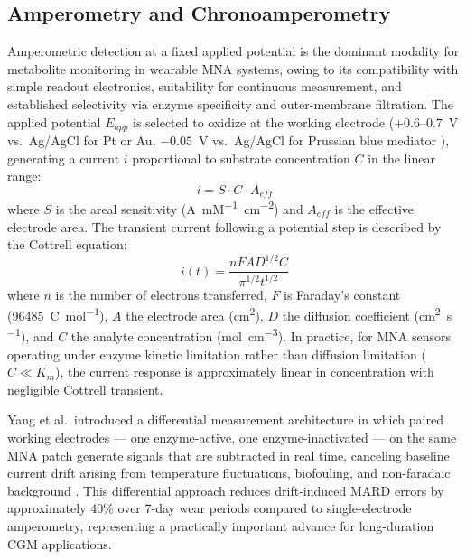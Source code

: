 \documentclass[review,1p]{elsarticle}
\begin{document}
\subsection{Amperometry and Chronoamperometry}
\label{subsec:amperometry}

Amperometric detection at a fixed applied potential is the dominant modality for metabolite monitoring in wearable MNA systems, owing to its compatibility with simple readout electronics, suitability for continuous measurement, and established selectivity via enzyme specificity and outer-membrane filtration. The applied potential $E_{app}$ is selected to oxidize  at the working electrode ($+0.6$--$0.7$~V vs.~Ag/AgCl for Pt or Au, $-0.05$~V vs.~Ag/AgCl for Prussian blue mediator \cite{Kabata2022}), generating a current $i$ proportional to substrate concentration $C$ in the linear range:
\begin{equation}
i = S \cdot C \cdot A_{eff}
\label{eq:amperometry}
\end{equation}
where $S$ is the areal sensitivity (\textmu{}A~mM\textsuperscript{$-1$}~cm\textsuperscript{$-2$}) and $A_{eff}$ is the effective electrode area. The transient current following a potential step is described by the Cottrell equation:
\begin{equation}
i(t) = \frac{nFAD^{1/2}C}{\pi^{1/2}t^{1/2}}
\label{eq:cottrell}
\end{equation}
where $n$ is the number of electrons transferred, $F$ is Faraday's constant (96485~C~mol\textsuperscript{$-1$}), $A$ the electrode area (cm\textsuperscript{2}), $D$ the diffusion coefficient (cm\textsuperscript{2}~s\textsuperscript{$-1$}), and $C$ the analyte concentration (mol~cm\textsuperscript{$-3$}). In practice, for MNA sensors operating under enzyme kinetic limitation rather than diffusion limitation ($C \ll K_m$), the current response is approximately linear in concentration with negligible Cottrell transient.

Yang et al.\ introduced a differential measurement architecture in which paired working electrodes — one enzyme-active, one enzyme-inactivated — on the same MNA patch generate signals that are subtracted in real time, canceling baseline current drift arising from temperature fluctuations, biofouling, and non-faradaic background \cite{Yang2024Differential}. This differential approach reduces drift-induced MARD errors by approximately 40\% over 7-day wear periods compared to single-electrode amperometry, representing a practically important advance for long-duration CGM applications.
\end{document}
